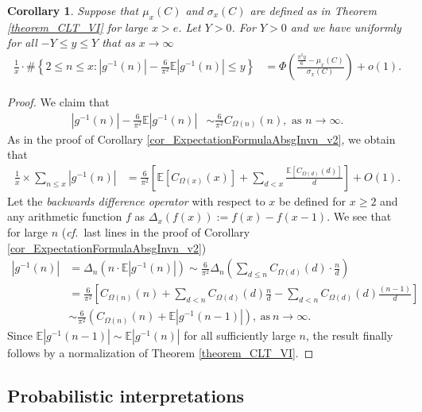 \documentclass[11pt,reqno,a4letter]{article}
\numberwithin{figure}{section}
\numberwithin{table}{section}
\newcommand{\cf}{\textit{cf.\ }}
\theoremstyle{plain}
\newtheorem{cor}[theorem]{Corollary}
\numberwithin{theorem}{section}
\theoremstyle{definition}
\begin{document}
\begin{cor} 
\label{cor_CLT_VII} 
Suppose that $\mu_x(C)$ and $\sigma_x(C)$ are defined as in 
Theorem \ref{theorem_CLT_VI} for large $x > e$. 
Let $Y > 0$. 
For $Y > 0$ and we have uniformly for all $-Y \leq y \leq Y$ 
that as $x \rightarrow \infty$ 
\begin{align*} 
\frac{1}{x} \cdot \#\left\{2 \leq n \leq x:|g^{-1}(n)| - 
     \frac{6}{\pi^2} \mathbb{E}|g^{-1}(n)| \leq y\right\} & = 
     \Phi\left(\frac{\frac{\pi^2 y}{6}-\mu_x(C)}{\sigma_x(C)}\right) + o(1). 
\end{align*} 
\end{cor} 
\begin{proof} 
We claim that 
\begin{align*} 
|g^{-1}(n)| - \frac{6}{\pi^2} \mathbb{E}|g^{-1}(n)| & \sim \frac{6}{\pi^2} C_{\Omega(n)}(n), 
     \text{\ as\ } n \rightarrow \infty. 
\end{align*} 
As in the proof of Corollary \ref{cor_ExpectationFormulaAbsgInvn_v2}, 
we obtain that 
\begin{align*} 
\frac{1}{x} \times \sum_{n \leq x} |g^{-1}(n)| & = 
     \frac{6}{\pi^2} \left[\mathbb{E}[C_{\Omega(x)}(x)] + \sum_{d<x} 
     \frac{\mathbb{E}[C_{\Omega(d)}(d)]}{d}\right] + O(1). 
\end{align*} 
Let the \emph{backwards difference operator} with respect to $x$ 
be defined for $x \geq 2$ and any arithmetic function $f$ as 
$\Delta_x(f(x)) := f(x) - f(x-1)$. 
We see that for large $n$ 
(\cf last lines in the proof of Corollary \ref{cor_ExpectationFormulaAbsgInvn_v2}) 
\begin{align*} 
|g^{-1}(n)| & = \Delta_n(n \cdot \mathbb{E}|g^{-1}(n)|) 
     \sim \frac{6}{\pi^2} \Delta_n\left(\sum_{d \leq n} C_{\Omega(d)}(d) \cdot \frac{n}{d}\right) \\ 
     & = \frac{6}{\pi^2}\left[C_{\Omega(n)}(n) + \sum_{d < n} C_{\Omega(d)}(d) \frac{n}{d} - 
     \sum_{d<n} C_{\Omega(d)}(d) \frac{(n-1)}{d}\right] \\ 
     & \sim \frac{6}{\pi^2} \left(C_{\Omega(n)}(n) + \mathbb{E}|g^{-1}(n-1)|\right), 
     \mathrm{\ as\ } n \rightarrow \infty. 
\end{align*} 
Since $\mathbb{E}|g^{-1}(n-1)| \sim \mathbb{E}|g^{-1}(n)|$ for all sufficiently large $n$, 
the result finally follows by a normalization of Theorem \ref{theorem_CLT_VI}. 
\end{proof} 

\subsection{Probabilistic interpretations} 
\label{subSection_ProbInterprets_Of_ErdosKacAnalogs} 
\end{document}
